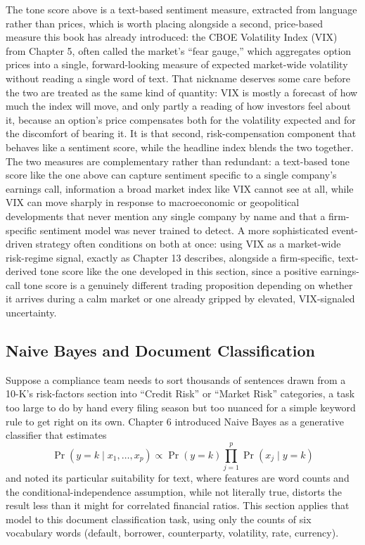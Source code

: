 \documentclass[../ai_in_finance]{subfiles}
\begin{document}
The tone score above is a text-based sentiment measure, extracted from language rather than prices, which is worth placing alongside a second, price-based measure this book has already introduced: the CBOE Volatility Index (VIX) from Chapter 5, often called the market's ``fear gauge,'' which aggregates option prices into a single, forward-looking measure of expected market-wide volatility without reading a single word of text. That nickname deserves some care before the two are treated as the same kind of quantity: VIX is mostly a forecast of how much the index will move, and only partly a reading of how investors feel about it, because an option's price compensates both for the volatility expected and for the discomfort of bearing it. It is that second, risk-compensation component that behaves like a sentiment score, while the headline index blends the two together. The two measures are complementary rather than redundant: a text-based tone score like the one above can capture sentiment specific to a single company's earnings call, information a broad market index like VIX cannot see at all, while VIX can move sharply in response to macroeconomic or geopolitical developments that never mention any single company by name and that a firm-specific sentiment model was never trained to detect. A more sophisticated event-driven strategy often conditions on both at once: using VIX as a market-wide risk-regime signal, exactly as Chapter 13 describes, alongside a firm-specific, text-derived tone score like the one developed in this section, since a positive earnings-call tone score is a genuinely different trading proposition depending on whether it arrives during a calm market or one already gripped by elevated, VIX-signaled uncertainty.

\subsection{Naive Bayes and Document Classification}
\label{sec:naive-bayes-text}

Suppose a compliance team needs to sort thousands of sentences drawn from a 10-K's risk-factors section into ``Credit Risk'' or ``Market Risk'' categories, a task too large to do by hand every filing season but too nuanced for a simple keyword rule to get right on its own. Chapter 6 introduced Naive Bayes as a generative classifier that estimates
$$\Pr(y=k \mid x_1,\ldots,x_p) \propto \Pr(y=k)\prod_{j=1}^p \Pr(x_j \mid y=k)$$
and noted its particular suitability for text, where features are word counts and the conditional-independence assumption, while not literally true, distorts the result less than it might for correlated financial ratios. This section applies that model to this document classification task, using only the counts of six vocabulary words (default, borrower, counterparty, volatility, rate, currency).
\end{document}

